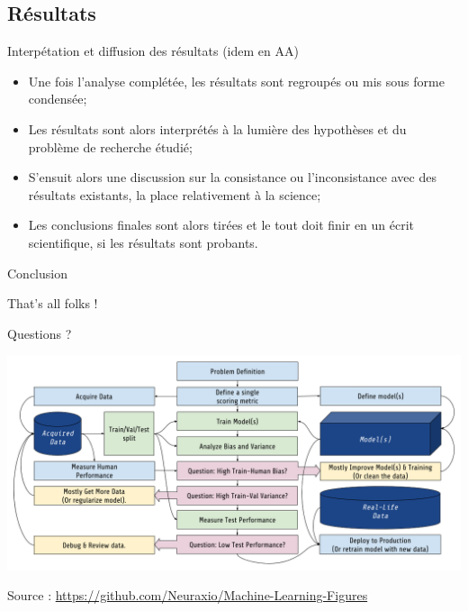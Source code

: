 \documentclass[french]{beamer}
\begin{document}
\subsection{Résultats}
\begin{frame}{Interpétation et diffusion des résultats (idem en AA)}
\begin{itemize}
	\item  Une fois l’analyse complétée, les résultats sont regroupés ou mis sous forme condensée;
	\item Les résultats sont alors interprétés à la lumière des hypothèses et du problème de recherche étudié;
	\item S’ensuit alors une discussion sur la consistance ou l’inconsistance avec des résultats existants,	la place relativement à la science;
	\item Les conclusions finales sont alors tirées et le tout doit finir en un écrit scientifique, si les résultats sont probants.
\end{itemize}
\end{frame}



\begin{frame}[label=conclu]{Conclusion}
\begin{center}
	\Huge{That's all folks !}

	\normalsize Questions ?

	\vspace{1cm}
	\includegraphics[width=.9\textwidth]{machine-learning-business-process}
\end{center}
\tiny{Source : \url{https://github.com/Neuraxio/Machine-Learning-Figures}}
\end{frame}


\end{document}
